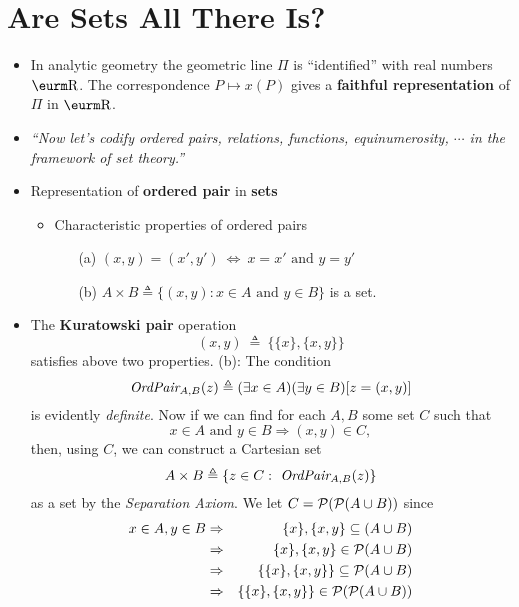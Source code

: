 \documentclass{myproc}
\begin{document}
\section{Are Sets All There Is?}
\begin{itemize}
\item In analytic geometry the geometric line $\Pi$ is 
	``identified'' with real numbers $\R$. The correspondence
	$P \mapsto x(P)$ gives a {\bf{}faithful representation} of $\Pi$
	in $\R$.
\item {\em{}``Now let's codify ordered pairs, relations, 
	functions, equinumerosity,
	$\cdots$ in the framework of set theory.''}
\item Representation of {\bf{}ordered pair} in {\bf{}sets}
	\begin{itemize}
	\item Characteristic properties of ordered pairs
		\begin{enumerate}
		\item [(a)] $(x, y) = (x', y') \ \Leftrightarrow\ 
			x = x' \mbox{\ and\ } y = y'$
		\item [(b)] $A\times B \triangleq 
			\{(x, y) : x \in A \mbox{\ and\ }
				y \in B\}$ is a set.
		\end{enumerate}
	\end{itemize}

	\item The {\bf{}Kuratowski pair} operation
		\[ (x, y)\ \triangleq\ \{\{x\}, \{x, y\}\} \]
		satisfies above two properties.
		\bit	
		(b): The condition
		\[ \mbox{\em{}OrdPair}_{A, B}(z) \triangleq
			(\exists{x}\in A)(\exists{y}\in B)[z = (x, y)] \]
		is evidently {\em{}definite\/}.
		Now if we can find for each $A, B$ some set $C$ such that
		\[ x \in A \mbox{\ and\ } y \in B \Rightarrow
			(x, y) \in C, 
		\]
		then, using $C$, we can construct a Cartesian set
		\[ A \times B \triangleq \{z \in C: 
			\mbox{\ \em{}OrdPair}_{A, B}(z)\}\]
		as a set by the {\em{}Separation Axiom\/}.
		We let $C = {\cal{}P}({\cal{}P}(A \cup B))$ since
		\begin{eqnarray*}
		x \in A, y \in B & \Rightarrow & \{x\}, \{x, y\} 
			\subseteq (A \cup B) \\
		& \Rightarrow & \{x\}, \{x, y\} \in {\cal{}P}(A \cup B)\\
		& \Rightarrow & \{\{x\}, \{x, y\}\} 
			\subseteq {\cal{}P}(A \cup B)\\
		& \Rightarrow & \{\{x\}, \{x, y\}\} 
			\in {\cal{}P}({\cal{}P}(A \cup B))
		\end{eqnarray*}
		\eit


\end{itemize}
\end{document}
